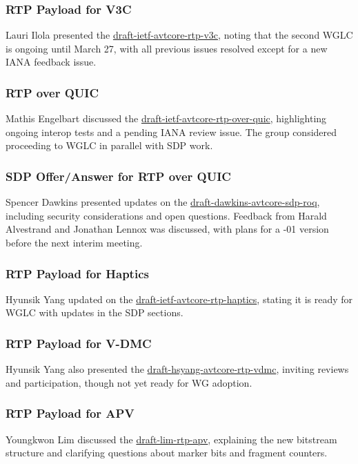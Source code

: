 \documentclass{article}
\begin{document}
\subsubsection{RTP Payload for V3C}
Lauri Ilola presented the \href{https://datatracker.ietf.org/doc/html/draft-ietf-avtcore-rtp-v3c}{draft-ietf-avtcore-rtp-v3c}, noting that the second WGLC is ongoing until March 27, with all previous issues resolved except for a new IANA feedback issue.

\subsubsection{RTP over QUIC}
Mathis Engelbart discussed the \href{https://datatracker.ietf.org/doc/html/draft-ietf-avtcore-rtp-over-quic}{draft-ietf-avtcore-rtp-over-quic}, highlighting ongoing interop tests and a pending IANA review issue. The group considered proceeding to WGLC in parallel with SDP work.

\subsubsection{SDP Offer/Answer for RTP over QUIC}
Spencer Dawkins presented updates on the \href{https://datatracker.ietf.org/doc/html/draft-dawkins-avtcore-sdp-roq}{draft-dawkins-avtcore-sdp-roq}, including security considerations and open questions. Feedback from Harald Alvestrand and Jonathan Lennox was discussed, with plans for a -01 version before the next interim meeting.

\subsubsection{RTP Payload for Haptics}
Hyunsik Yang updated on the \href{https://datatracker.ietf.org/doc/html/draft-ietf-avtcore-rtp-haptics}{draft-ietf-avtcore-rtp-haptics}, stating it is ready for WGLC with updates in the SDP sections.

\subsubsection{RTP Payload for V-DMC}
Hyunsik Yang also presented the \href{https://datatracker.ietf.org/doc/html/draft-hsyang-avtcore-rtp-vdmc}{draft-hsyang-avtcore-rtp-vdmc}, inviting reviews and participation, though not yet ready for WG adoption.

\subsubsection{RTP Payload for APV}
Youngkwon Lim discussed the \href{https://datatracker.ietf.org/doc/html/draft-lim-rtp-apv}{draft-lim-rtp-apv}, explaining the new bitstream structure and clarifying questions about marker bits and fragment counters.
\end{document}
